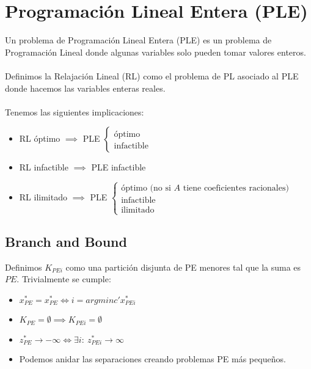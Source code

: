 \documentclass{myclass}
\begin{document}
\section{Programación Lineal Entera (PLE)}
Un problema de Programación Lineal Entera (PLE) es un problema de Programación Lineal donde algunas variables solo pueden tomar valores enteros. \\
\\
Definimos la Relajación Lineal (RL) como el problema de PL asociado al PLE donde hacemos las variables enteras reales.\\
\\
Tenemos las siguientes implicaciones:
\begin{itemize}
  \item RL óptimo $\implies$ PLE $\begin{cases}
   \text{óptimo} \\
   \text{infactible}   
  \end{cases}$
\item RL infactible $\implies$ PLE infactible
\item RL ilimitado $\implies$ PLE $\begin{cases}
  \text{óptimo (no si } A \text{ tiene coeficientes racionales)} \\
  \text{infactible} \\
  \text{ilimitado}
\end{cases}$
\end{itemize}
\subsection{Branch and Bound}
Definimos $K_{PEi}$ como una partición disjunta de PE menores tal que la suma es $PE$. Trivialmente se cumple:
\begin{itemize}
  \item $x^*_{PE} = x^*_{PE} \iff i = argmin{c'x^*_{PEi}}$ 
  \item $K_{PE} = \emptyset \implies K_{PEi} = \emptyset$
  \item $z_{PE}^*\to -\infty \iff \exists i: \ z_{PEi}^*\to \infty$
  \item Podemos anidar las separaciones creando problemas PE más pequeños.
\end{itemize}
\end{document}
